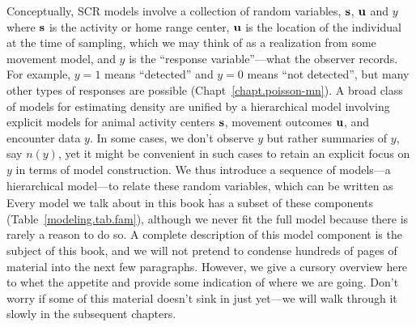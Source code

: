 Conceptually, SCR models involve a collection of random
variables, ${\bf s}$, ${\bf u}$ and $y$ where ${\bf s}$ is the
activity or home range center, ${\bf u}$ is the location of the
individual at the time of sampling,
which we may think of as a realization from some movement
model, and $y$ is the ``response variable''---what the observer
records. For example, $y=1$ means ``detected'' and $y=0$ means ``not
detected'', but many other types of responses are possible
(Chapt~\ref{chapt.poisson-mn}).
A broad class of models for estimating density are unified by a
hierarchical model involving explicit models for
animal activity centers ${\bf s}$, movement outcomes ${\bf u}$, and
encounter data $y$.  In some cases, we don't observe $y$ but rather
summaries of $y$, say $n(y)$, yet it might be convenient in such cases
to retain an explicit focus on $y$ in terms of model construction.
We thus introduce a sequence of models---a hierarchical model---to
relate these random variables, which can be written as
%
\begin{equation}
[n(y)|y][y|{\bf u}][{\bf u}|{\bf s}][{\bf s}].
\label{modeling.eq.nyus}
\end{equation}
Every model we talk about in this book has
a subset of these components (Table~\ref{modeling.tab.fam}), although we never fit the
full model because there is
rarely a reason to do so. A complete description of this model
component is the subject of this book, and we will not pretend to
condense hundreds of pages of material into the next few
paragraphs. However, we give a cursory overview here to whet the appetite and provide some
indication of where we are going. Don't worry if some of this material
doesn't sink in just yet---we will walk through it
slowly in the subsequent chapters.

